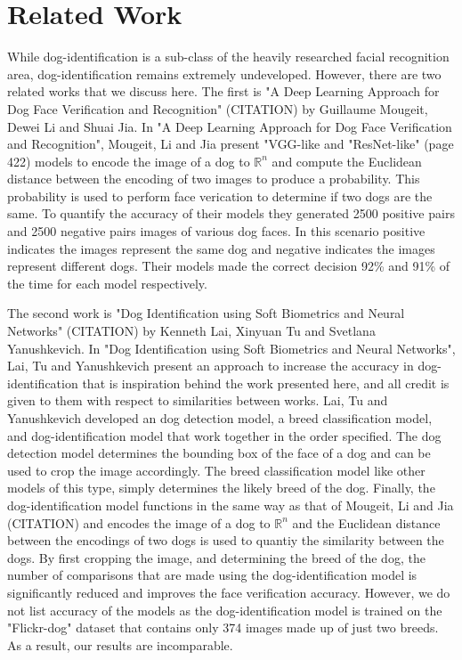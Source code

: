 \documentclass{article}
\begin{document}
\section*{Related Work}
While dog-identification is a sub-class of the heavily researched facial recognition area, dog-identification remains extremely undeveloped.  However, there are two related works that we discuss here.  The first is "A Deep Learning Approach for Dog Face Verification and Recognition" (CITATION)  by  Guillaume Mougeit, Dewei Li and Shuai Jia.  In "A Deep Learning Approach for Dog Face Verification and Recognition", Mougeit, Li and Jia present "VGG-like and "ResNet-like" (page 422) models to encode the image of a dog to $\mathbb{R}^n$ and compute the Euclidean distance between the encoding of two images to produce a probability.  This probability is used to perform face verication to determine if two dogs are the same.  To quantify the accuracy of their models they generated 2500 positive pairs and 2500 negative pairs images of various dog faces.  In this scenario positive indicates the images represent the same dog and negative indicates the images represent different dogs.  Their models made the correct decision 92\% and 91\% of the time for each model respectively.

The second work is "Dog Identification using Soft Biometrics and Neural Networks" (CITATION) by Kenneth Lai, Xinyuan Tu and Svetlana Yanushkevich.  In "Dog Identification using Soft Biometrics and Neural Networks", Lai, Tu and Yanushkevich present an approach to increase the accuracy in dog-identification that is inspiration behind the work presented here, and all credit is given to them with respect to similarities between works.  Lai, Tu and Yanushkevich developed an dog detection model, a breed classification model, and dog-identification model that work together in the order specified.   The dog detection model determines the bounding box of the face of a dog and can be used to crop the image accordingly.  The breed classification model like other models of this type, simply determines the likely breed of the dog.  Finally, the dog-identification model functions in the same way as that of  Mougeit, Li and Jia (CITATION) and encodes the image of a dog to $\mathbb{R}^n$ and the Euclidean distance between the encodings of two dogs is used to quantiy the similarity between the dogs.  By first cropping the image, and determining the breed of the dog, the number of comparisons that are made using the dog-identification model is significantly reduced and improves the face verification accuracy.  However, we do not list accuracy of the models as the dog-identification model is trained on the "Flickr-dog" dataset that contains only 374 images made up of just two breeds.  As a result, our results are incomparable.
\end{document}
